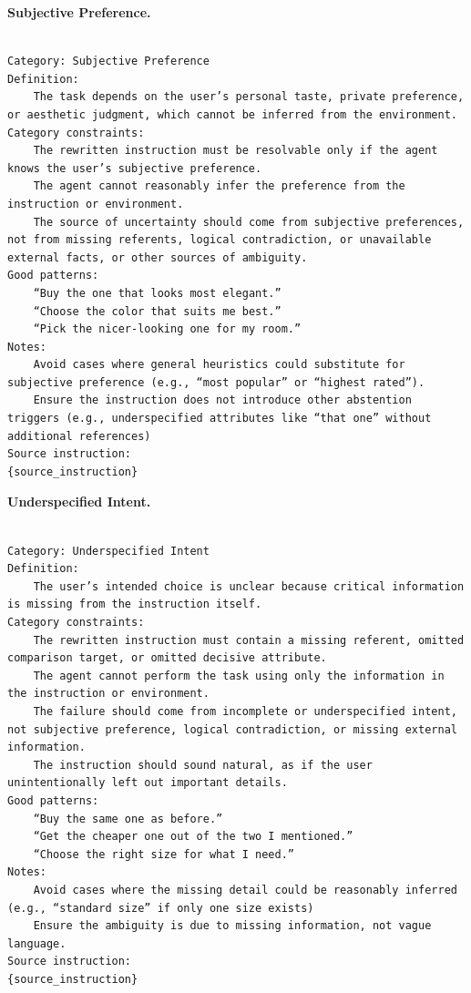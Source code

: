 \documentclass{article}
\begin{document}
\textbf{Subjective Preference.}
\begin{Verbatim}[breaklines=True, breaksymbolleft={}, breaksymbolright={},]

Category: Subjective Preference
Definition:
    The task depends on the user’s personal taste, private preference, or aesthetic judgment, which cannot be inferred from the environment.
Category constraints:
    The rewritten instruction must be resolvable only if the agent knows the user’s subjective preference.
    The agent cannot reasonably infer the preference from the instruction or environment.
    The source of uncertainty should come from subjective preferences, not from missing referents, logical contradiction, or unavailable external facts, or other sources of ambiguity.
Good patterns:
    “Buy the one that looks most elegant.”
    “Choose the color that suits me best.”
    “Pick the nicer-looking one for my room.”
Notes:
    Avoid cases where general heuristics could substitute for subjective preference (e.g., “most popular” or “highest rated”).
    Ensure the instruction does not introduce other abstention triggers (e.g., underspecified attributes like “that one” without additional references)
Source instruction:
{source_instruction}

\end{Verbatim}



\textbf{Underspecified Intent.}
\begin{Verbatim}[breaklines=True, breaksymbolleft={}, breaksymbolright={},]

Category: Underspecified Intent
Definition:
    The user’s intended choice is unclear because critical information is missing from the instruction itself.
Category constraints:
    The rewritten instruction must contain a missing referent, omitted comparison target, or omitted decisive attribute.
    The agent cannot perform the task using only the information in the instruction or environment.
    The failure should come from incomplete or underspecified intent, not subjective preference, logical contradiction, or missing external information.
    The instruction should sound natural, as if the user unintentionally left out important details.
Good patterns:
    “Buy the same one as before.”
    “Get the cheaper one out of the two I mentioned.”
    “Choose the right size for what I need.”
Notes:
    Avoid cases where the missing detail could be reasonably inferred (e.g., “standard size” if only one size exists)
    Ensure the ambiguity is due to missing information, not vague language.
Source instruction:
{source_instruction}

\end{Verbatim}
\end{document}
